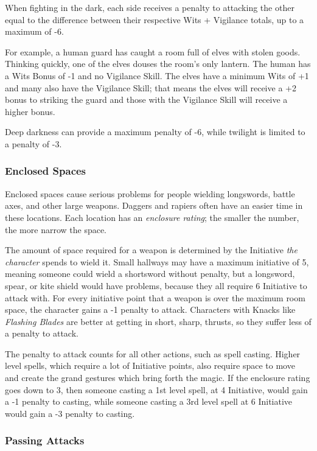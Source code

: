 \begin{multicols}{2}
When fighting in the dark, each side receives a penalty to attacking the other equal to the difference between their respective Wits + Vigilance totals, up to a maximum of -6.

For example, a human guard has caught a room full of elves with stolen goods. Thinking quickly, one of the elves douses the room's only lantern. The human has a Wits Bonus of -1 and no Vigilance Skill. The elves have a minimum Wits of +1 and many also have the Vigilance Skill; that means the elves will receive a +2 bonus to striking the guard and those with the Vigilance Skill will receive a higher bonus.

Deep darkness can provide a maximum penalty of -6, while twilight is limited to a penalty of -3.

\subsubsection{Enclosed Spaces}

Enclosed spaces cause serious problems for people wielding longswords, battle axes, and other large weapons.
Daggers and rapiers often have an easier time in these locations.
Each location has an \textit{enclosure rating}; the smaller the number, the more narrow the space.

The amount of space required for a weapon is determined by the Initiative \textit{the character} spends to wield it.
Small hallways may have a maximum initiative of 5, meaning someone could wield a shortsword without penalty, but a longsword, spear, or kite shield would have problems, because they all require 6 Initiative to attack with.
For every initiative point that a weapon is over the maximum room space, the character gains a -1 penalty to attack.
Characters with Knacks like \textit{Flashing Blades} are better at getting in short, sharp, thrusts, so they suffer less of a penalty to attack.

The penalty to attack counts for all other actions, such as spell casting.
Higher level spells, which require a lot of Initiative points, also require space to move and create the grand gestures which bring forth the magic.
If the enclosure rating goes down to 3, then someone casting a 1st level spell, at 4 Initiative, would gain a -1 penalty to casting, while someone casting a 3rd level spell at 6 Initiative would gain a -3 penalty to casting.

\subsubsection{Passing Attacks}


\end{multicols}
